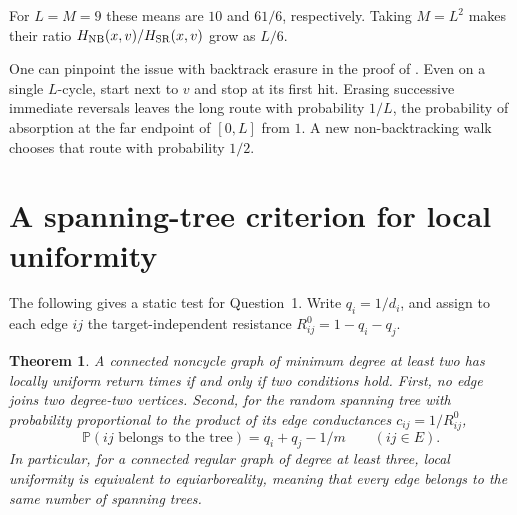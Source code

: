 \documentclass[11pt]{article}
\newtheorem{theorem}{Theorem}
\begin{document}
For $L=M=9$ these means are $10$ and $61/6$, respectively. Taking $M=L^2$
makes their ratio $H_{\rm NB}(x,v)/H_{\rm SR}(x,v)$ grow as $L/6$.

One can pinpoint the issue with backtrack erasure in the proof of \cite[Theorem~4]{tabu}. Even on a single $L$-cycle, start next to $v$ and stop at its first hit. Erasing successive immediate reversals leaves the long route with probability $1/L$, the probability of absorption at the far endpoint of $[0,L]$ from $1$. A new non-backtracking walk chooses that route with probability $1/2$.

\section{A spanning-tree criterion for local uniformity}

The following gives a static test for Question~1. Write $q_i=1/d_i$,
and assign to each edge $ij$ the target-independent resistance
$R^0_{ij}=1-q_i-q_j$.

\begin{theorem}
A connected noncycle graph of minimum degree at least two has locally
uniform return times if and only if two conditions hold. First, no edge joins two degree-two vertices. Second, for the random spanning tree
with probability proportional to the product of its edge conductances
$c_{ij}=1/R^0_{ij}$,
\[
     \mathbb P(ij\text{ belongs to the tree})
        =q_i+q_j-1/m \qquad (ij\in E).
\]
In particular, for a connected regular graph of degree at least three,
local uniformity is equivalent to equiarboreality, meaning that every edge belongs
to the same number of spanning trees.
\end{theorem}
\end{document}
